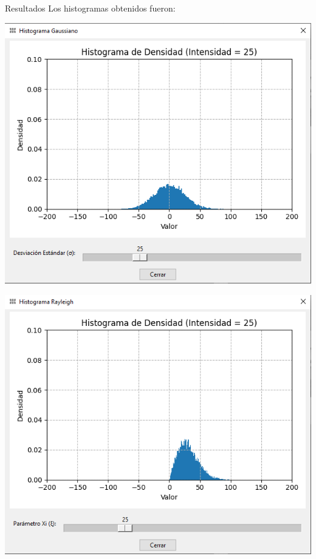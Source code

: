 \documentclass{beamer}
\begin{document}
\begin{frame}[fragile]{Resultados}
	\justifying
	Los histogramas obtenidos fueron:
	\vspace{0.3cm}
	
	\centering
	\begin{minipage}{0.32\linewidth}
		\centering
		\includegraphics[width=\linewidth]{../results/dist_gauss}
	\end{minipage}\hfill
	\begin{minipage}{0.32\linewidth}
		\centering
		\includegraphics[width=\linewidth]{../results/dist_rayleigh}

\end{minipage}
\end{frame}
\end{document}
